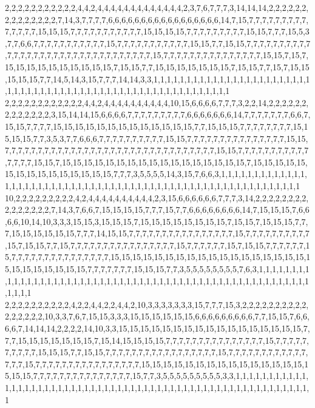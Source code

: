 2,2,2,2,2,2,2,2,2,2,2,4,4,2,4,4,4,4,4,4,4,4,4,4,4,4,4,2,3,7,6,7,7,7,3,14,14,14,2,2,2,2,2,2,2,2,2,2,2,2,2,2,7,14,3,7,7,7,7,6,6,6,6,6,6,6,6,6,6,6,6,6,6,6,6,6,14,7,15,7,7,7,7,7,7,7,7,7,7,7,7,7,7,15,15,15,7,7,7,7,7,7,7,7,7,7,7,15,15,15,15,7,7,7,7,7,7,7,7,7,15,15,7,7,7,15,5,3,7,7,6,6,7,7,7,7,7,7,7,7,7,7,7,15,7,7,7,7,7,7,7,7,7,7,7,15,15,7,7,15,15,7,7,7,7,7,7,7,7,7,7,7,7,7,7,7,7,7,7,7,7,7,7,7,7,7,7,7,7,7,7,7,7,15,7,7,7,7,7,7,7,7,7,7,7,7,7,7,7,15,15,7,15,7,15,15,15,15,15,15,15,15,15,15,7,15,15,7,7,15,15,15,15,15,15,15,7,15,15,7,7,15,7,15,15,15,15,15,7,7,14,5,14,3,15,7,7,7,14,14,3,3,1,1,1,1,1,1,1,1,1,1,1,1,1,1,1,1,1,1,1,1,1,1,1,1,1,1,1,1,1,1,1,1,1,1,1,1,1,1,1,1,1,1,1,1,1,1,1,1,1,1,1,1,1,1,1,1,1,1
2,2,2,2,2,2,2,2,2,2,2,2,4,4,2,4,4,4,4,4,4,4,4,4,4,10,15,6,6,6,6,7,7,7,3,2,2,14,2,2,2,2,2,2,2,2,2,2,2,2,2,3,15,14,14,15,6,6,6,6,7,7,7,7,7,7,7,7,7,6,6,6,6,6,6,6,14,7,7,7,7,7,7,7,6,6,7,15,15,7,7,7,7,15,15,15,15,15,15,15,15,15,15,15,15,15,7,7,15,15,15,7,7,7,7,7,7,7,7,15,15,15,15,7,7,3,5,3,7,7,6,6,6,7,7,7,7,7,7,7,7,7,7,15,15,7,7,7,7,7,7,7,7,7,7,7,7,7,7,7,15,15,7,7,7,7,7,7,7,7,7,7,7,7,7,7,7,7,7,7,7,7,7,7,7,7,7,7,7,7,7,7,7,7,15,15,7,7,7,7,7,7,7,7,7,7,7,7,7,7,7,15,15,7,15,15,15,15,15,15,15,15,15,15,15,15,15,15,15,15,15,7,15,15,15,15,15,15,15,15,15,15,15,15,15,15,15,7,7,7,3,5,5,5,5,14,3,15,7,6,6,3,1,1,1,1,1,1,1,1,1,1,1,1,1,1,1,1,1,1,1,1,1,1,1,1,1,1,1,1,1,1,1,1,1,1,1,1,1,1,1,1,1,1,1,1,1,1,1,1,1,1,1,1,1,1,1,1,1,1
10,2,2,2,2,2,2,2,2,2,4,2,4,4,4,4,4,4,4,4,4,4,2,3,15,6,6,6,6,6,6,7,7,7,3,14,2,2,2,2,2,2,2,2,2,2,2,2,2,2,2,7,14,3,7,6,6,7,15,15,15,15,7,7,7,15,7,7,6,6,6,6,6,6,6,6,14,7,15,15,15,7,6,6,6,6,10,14,10,3,3,3,15,15,3,15,15,15,7,15,15,15,15,15,15,15,15,7,15,15,7,15,15,15,7,7,7,15,15,15,15,15,15,7,7,7,14,15,15,7,7,7,7,7,7,7,7,7,7,7,7,7,7,7,7,15,7,7,7,7,7,7,7,7,7,7,15,7,15,15,7,7,15,7,7,7,7,7,7,7,7,7,7,7,7,7,7,7,7,15,7,7,7,7,7,7,15,7,15,15,7,7,7,7,7,7,15,7,7,7,7,7,7,7,7,7,7,7,7,7,7,7,15,15,15,15,15,15,15,15,15,15,15,15,15,15,15,15,15,15,15,15,15,15,15,15,15,15,7,7,7,7,7,7,7,15,15,15,7,7,3,5,5,5,5,5,5,5,5,7,6,3,1,1,1,1,1,1,1,1,1,1,1,1,1,1,1,1,1,1,1,1,1,1,1,1,1,1,1,1,1,1,1,1,1,1,1,1,1,1,1,1,1,1,1,1,1,1,1,1,1,1,1,1,1,1,1,1,1,1
2,2,2,2,2,2,2,2,2,2,4,2,2,4,4,2,2,4,4,2,10,3,3,3,3,3,3,3,15,7,7,7,15,3,2,2,2,2,2,2,2,2,2,2,2,2,2,2,2,2,10,3,3,7,6,7,15,15,3,3,3,15,15,15,15,15,15,6,6,6,6,6,6,6,6,6,7,7,15,15,7,6,6,6,6,7,14,14,14,2,2,2,2,14,10,3,3,15,15,15,15,15,15,15,15,15,15,15,15,15,15,15,15,15,7,7,7,15,15,15,15,15,15,15,7,15,14,15,15,15,15,7,7,7,7,7,7,7,7,7,7,7,7,7,7,7,15,7,7,7,7,7,7,7,7,7,7,15,15,15,7,7,15,15,7,7,7,7,7,7,7,7,7,7,7,7,7,7,7,7,7,15,7,7,7,7,7,7,7,7,7,7,7,7,7,7,7,15,7,7,7,7,7,7,7,7,7,7,7,7,7,7,7,7,15,15,15,15,15,15,15,15,15,15,15,15,15,15,15,15,15,15,7,7,7,7,7,7,7,7,7,7,7,7,7,7,7,15,7,7,3,5,5,5,5,5,5,5,5,5,3,3,1,1,1,1,1,1,1,1,1,1,1,1,1,1,1,1,1,1,1,1,1,1,1,1,1,1,1,1,1,1,1,1,1,1,1,1,1,1,1,1,1,1,1,1,1,1,1,1,1,1,1,1,1,1,1,1,1,1
